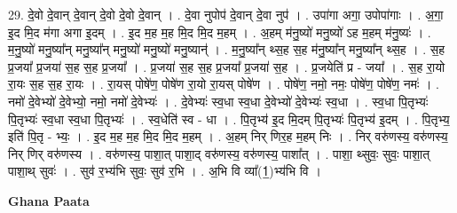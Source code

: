 \documentclass[17pt]{extarticle}
\begin{document}
29. दे॒वो दे॒वान् दे॒वान् दे॒वो दे॒वो दे॒वान् । . दे॒वा नुपोप॑ दे॒वान् दे॒वा नुप॑ । . उपा॑गा अगा॒ उपोपा॑गाः । . अ॒गा॒ इ॒द मि॒द म॑गा अगा इ॒दम् । . इ॒द म॒ह म॒ह मि॒द मि॒द म॒हम् । . अ॒हम् म॑नु॒ष्यो॑ मनु॒ष्यो॑ ऽह म॒हम् म॑नु॒ष्यः॑ । . म॒नु॒ष्यो॑ मनु॒ष्या᳚न् मनु॒ष्या᳚न् मनु॒ष्यो॑ मनु॒ष्यो॑ मनु॒ष्यान्॑ । . म॒नु॒ष्या᳚न् थ्स॒ह स॒ह म॑नु॒ष्या᳚न् मनु॒ष्या᳚न् थ्स॒ह । . स॒ह प्र॒जया᳚ प्र॒जया॑ स॒ह स॒ह प्र॒जया᳚ । . प्र॒जया॑ स॒ह स॒ह प्र॒जया᳚ प्र॒जया॑ स॒ह । . प्र॒जयेति॑ प्र - जया᳚ । . स॒ह रा॒यो रा॒यः स॒ह स॒ह रा॒यः । . रा॒यस् पोषे॑ण॒ पोषे॑ण रा॒यो रा॒यस् पोषे॑ण । . पोषे॑ण॒ नमो॒ नमः॒ पोषे॑ण॒ पोषे॑ण॒ नमः॑ । . नमो॑ दे॒वेभ्यो॑ दे॒वेभ्यो॒ नमो॒ नमो॑ दे॒वेभ्यः॑ । . दे॒वेभ्यः॑ स्व॒धा स्व॒धा दे॒वेभ्यो॑ दे॒वेभ्यः॑ स्व॒धा । . स्व॒धा पि॒तृभ्यः॑ पि॒तृभ्यः॑ स्व॒धा स्व॒धा पि॒तृभ्यः॑ । . स्व॒धेति॑ स्व - धा । . पि॒तृभ्य॑ इ॒द मि॒दम् पि॒तृभ्यः॑ पि॒तृभ्य॑ इ॒दम् । . पि॒तृभ्य॒ इति॑ पि॒तृ - भ्यः॒ । . इ॒द म॒ह म॒ह मि॒द मि॒द म॒हम् । . अ॒हम् निर् णिर॒ह म॒हम् निः । . निर् वरु॑णस्य॒ वरु॑णस्य॒ निर् णिर् वरु॑णस्य । . वरु॑णस्य॒ पाशा॒त् पाशा॒द् वरु॑णस्य॒ वरु॑णस्य॒ पाशा᳚त् । . पाशा॒ थ्सुवः॒ सुवः॒ पाशा॒त् पाशा॒थ् सुवः॑ । . सुव॑ र॒भ्य॑भि सुवः॒ सुव॑ र॒भि । . अ॒भि वि व्या᳚(1॒)भ्य॑भि वि । \newline

\textbf{Ghana Paata } \newline
\end{document}
